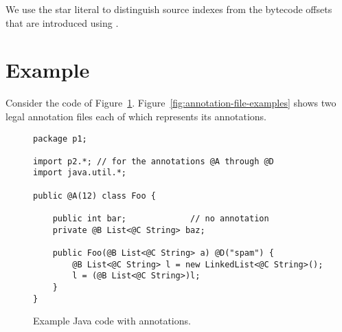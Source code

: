 \documentclass{article}
\begin{document}
We use the star literal \bnflit{*} to distinguish source indexes from
the bytecode offsets that are introduced using \bnflit{\#}.




\section{Example\label{example}}

Consider the code of Figure~\ref{fig:java-example}.
Figure~\ref{fig:annotation-file-examples} shows two legal annotation files
each of which represents its annotations.


\begin{figure}
\begin{verbatim}
package p1;

import p2.*; // for the annotations @A through @D
import java.util.*;

public @A(12) class Foo {

    public int bar;             // no annotation
    private @B List<@C String> baz;

    public Foo(@B List<@C String> a) @D("spam") {
        @B List<@C String> l = new LinkedList<@C String>();
        l = (@B List<@C String>)l;
    }
}
\end{verbatim}
\caption{Example Java code with annotations.}
\label{fig:java-example}
\end{figure}
\end{document}
